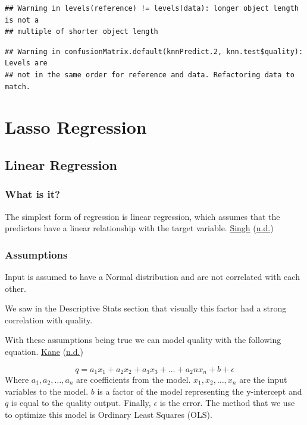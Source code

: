 \documentclass[
]{book}
\begin{document}
\begin{verbatim}
## Warning in levels(reference) != levels(data): longer object length is not a
## multiple of shorter object length
\end{verbatim}

\begin{verbatim}
## Warning in confusionMatrix.default(knnPredict.2, knn.test$quality): Levels are
## not in the same order for reference and data. Refactoring data to match.
\end{verbatim}

\hypertarget{lasso-regression}{%
\chapter{Lasso Regression}\label{lasso-regression}}

\hypertarget{linear-regression}{%
\section{Linear Regression}\label{linear-regression}}

\hypertarget{what-is-it}{%
\subsection{What is it?}\label{what-is-it}}

The simplest form of regression is linear regression, which assumes that the predictors have a linear relationship with the target variable. \protect\hyperlink{ref-regression_r}{Singh} (\protect\hyperlink{ref-regression_r}{n.d.})\\

\hypertarget{assumptions}{%
\subsection{Assumptions}\label{assumptions}}

Input is assumed to have a Normal distribution and are not correlated with each other.

We saw in the Descriptive Stats section that visually this factor had a strong correlation with quality.

With these assumptions being true we can model quality with the following equation. \protect\hyperlink{ref-elastic_net}{Kane} (\protect\hyperlink{ref-elastic_net}{n.d.})

\[ q = a_1x_1 + a_2x_2 + a_3x_3 + \dots + a_2nx_n + b + \epsilon\]
Where \(a_1, a_2, \dots, a_n\) are coefficients from the model. \(x_1, x_2, \dots, x_n\) are the input variables to the model. \(b\) is a factor of the model representing the y-intercept and \(q\) is equal to the quality output. Finally, \(\epsilon\) is the error.
The method that we use to optimize this model is Ordinary Least Squares (OLS).
\end{document}
